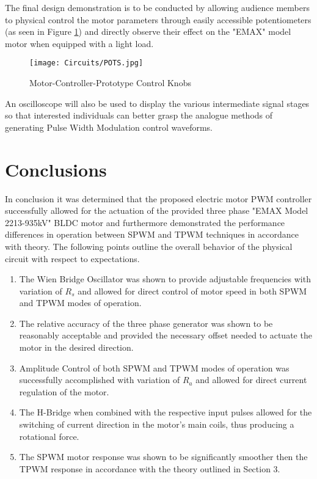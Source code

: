 \documentclass[12pt]{article}
\begin{document}
The final design demonstration is to be conducted by allowing audience members to physical control the motor parameters through easily accessible potentiometers (as seen in Figure \ref{POTS}) and directly observe their effect on the "EMAX" model motor when equipped with a light load. 

\begin{figure}[H]
\centering
\caption{Motor-Controller-Prototype Control Knobs}
\texttt{[image: Circuits/POTS.jpg]}
\label{POTS}
\end{figure}

An oscilloscope will also be used to display the various intermediate signal stages so that interested individuals can better grasp the analogue methods of generating Pulse Width Modulation control waveforms.
\pagebreak
\section{Conclusions}%

In conclusion it was determined that the proposed electric motor PWM controller successfully allowed for the actuation of the provided three phase "EMAX Model 2213-935kV" BLDC motor and furthermore demonstrated the performance differences in operation between SPWM and TPWM techniques in accordance with theory. The following points outline the overall behavior of the physical circuit with respect to expectations.

\begin{enumerate}
    \item The Wien Bridge Oscillator was shown to provide adjustable frequencies with variation of $R_s$ and allowed for direct control of motor speed in both SPWM and TPWM modes of operation.
    \item The relative accuracy of the three phase generator was shown to be reasonably acceptable and provided the necessary offset needed to actuate the motor in the desired direction.
    \item Amplitude Control of both SPWM and TPWM modes of operation was successfully accomplished with variation of $R_a$ and allowed for direct current regulation of the motor.
    \item The H-Bridge when combined with the respective input pulses allowed for the switching of current direction in the motor's main coils, thus producing a rotational force.
    \item The SPWM motor response was shown to be significantly smoother then the TPWM response in accordance with the theory outlined in Section 3.
\end{enumerate}
\end{document}
